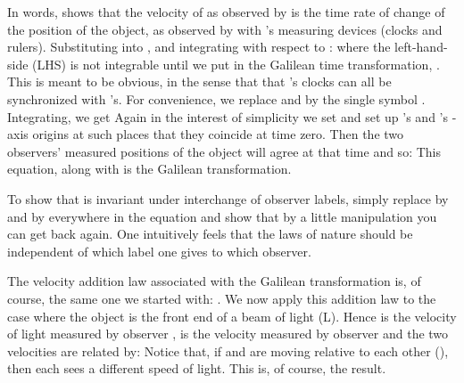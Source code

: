 {In words,  shows that the velocity of  as observed by
 is the time rate of change of the position of the object, as observed by
 with 's measuring devices (clocks and rulers).
Substituting  into , and integrating with
respect to :
%
%
where the left-hand-side (LHS) is not integrable until we put in the Galilean
time transformation, .
This is meant to be obvious, in the sense that  that 's
clocks can all be synchronized with 's.
For convenience, we replace  and  by the single symbol
.
Integrating, we get
%
%
Again in the interest of simplicity we set  and set up 's and 's
-axis origins at such places that they coincide at time zero.
Then the two observers' measured positions of the object will agree at that
time and so:
%
%
This equation, along with  is the Galilean
transformation.

To show that  is invariant under interchange of observer
labels, simply replace  by  and  by  everywhere in the equation
and show that by a little manipulation you can get  back
again.
One intuitively feels that the laws of nature should be independent of which
label one gives to which observer.

The velocity addition law associated with the Galilean transformation is, of
course, the same one we started with: .
We now apply this addition law to the case where the object  is the front
end of a beam of light (L).
Hence  is the velocity of light measured by observer
,  is the velocity measured by observer  and the
two velocities are related by:
%
%
Notice that, if  and  are moving relative to each other
(), then each sees a different speed of light.
This is, of course, the  result.
}%

